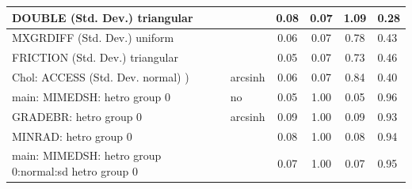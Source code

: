 \begin{table}
\begin{center}
\begin{tabular}{|l|l|c|c|c|l|}
			\hline
			DOUBLE (Std. Dev.) triangular &  & 0.08 & 0.07 & 1.09 & 0.28 \\
			\hline
			MXGRDIFF (Std. Dev.) uniform &  & 0.06 & 0.07 & 0.78 & 0.43 \\
			\hline
			FRICTION (Std. Dev.) triangular &  & 0.05 & 0.07 & 0.73 & 0.46 \\
			\hline
			 Chol: ACCESS (Std. Dev. normal) ) & arcsinh & 0.06 & 0.07 & 0.84 & 0.40 \\
			\hline
			main: MIMEDSH: hetro group 0 & no & 0.05 & 1.00 & 0.05 & 0.96 \\
			\hline
			GRADEBR: hetro group 0 & arcsinh & 0.09 & 1.00 & 0.09 & 0.93 \\
			\hline
			MINRAD: hetro group 0 &  & 0.08 & 1.00 & 0.08 & 0.94 \\
			\hline
			main: MIMEDSH: hetro group 0:normal:sd  hetro group 0 &  & 0.07 & 1.00 & 0.07 & 0.95 \\
			\hline
		\end{tabular}
	\end{center}
\end{table}